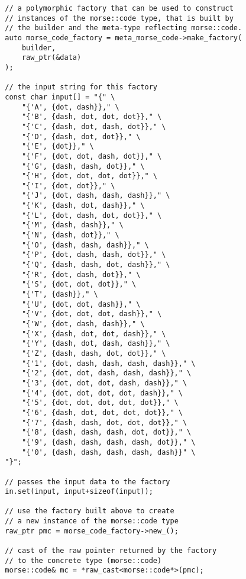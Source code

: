 \begin{verbatim}
        // a polymorphic factory that can be used to construct
        // instances of the morse::code type, that is built by
        // the builder and the meta-type reflecting morse::code.
        auto morse_code_factory = meta_morse_code->make_factory(
            builder,
            raw_ptr(&data)
        );

        // the input string for this factory
        const char input[] = "{" \
            "{'A', {dot, dash}}," \
            "{'B', {dash, dot, dot, dot}}," \
            "{'C', {dash, dot, dash, dot}}," \
            "{'D', {dash, dot, dot}}," \
            "{'E', {dot}}," \
            "{'F', {dot, dot, dash, dot}}," \
            "{'G', {dash, dash, dot}}," \
            "{'H', {dot, dot, dot, dot}}," \
            "{'I', {dot, dot}}," \
            "{'J', {dot, dash, dash, dash}}," \
            "{'K', {dash, dot, dash}}," \
            "{'L', {dot, dash, dot, dot}}," \
            "{'M', {dash, dash}}," \
            "{'N', {dash, dot}}," \
            "{'O', {dash, dash, dash}}," \
            "{'P', {dot, dash, dash, dot}}," \
            "{'Q', {dash, dash, dot, dash}}," \
            "{'R', {dot, dash, dot}}," \
            "{'S', {dot, dot, dot}}," \
            "{'T', {dash}}," \
            "{'U', {dot, dot, dash}}," \
            "{'V', {dot, dot, dot, dash}}," \
            "{'W', {dot, dash, dash}}," \
            "{'X', {dash, dot, dot, dash}}," \
            "{'Y', {dash, dot, dash, dash}}," \
            "{'Z', {dash, dash, dot, dot}}," \
            "{'1', {dot, dash, dash, dash, dash}}," \
            "{'2', {dot, dot, dash, dash, dash}}," \
            "{'3', {dot, dot, dot, dash, dash}}," \
            "{'4', {dot, dot, dot, dot, dash}}," \
            "{'5', {dot, dot, dot, dot, dot}}," \
            "{'6', {dash, dot, dot, dot, dot}}," \
            "{'7', {dash, dash, dot, dot, dot}}," \
            "{'8', {dash, dash, dash, dot, dot}}," \
            "{'9', {dash, dash, dash, dash, dot}}," \
            "{'0', {dash, dash, dash, dash, dash}}" \
        "}";

        // passes the input data to the factory
        in.set(input, input+sizeof(input));

        // use the factory built above to create
        // a new instance of the morse::code type
        raw_ptr pmc = morse_code_factory->new_();

        // cast of the raw pointer returned by the factory
        // to the concrete type (morse::code)
        morse::code& mc = *raw_cast<morse::code*>(pmc);


\end{verbatim}

